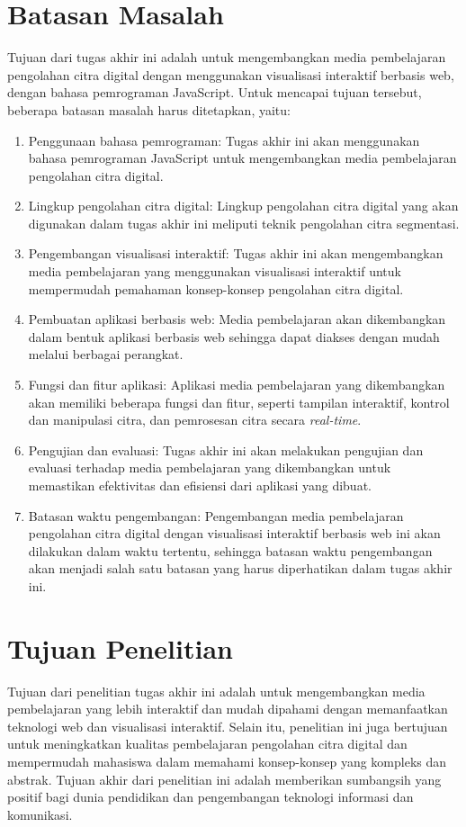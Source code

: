 \section{Batasan Masalah}
Tujuan dari tugas akhir ini adalah untuk mengembangkan media pembelajaran pengolahan citra digital dengan menggunakan visualisasi interaktif berbasis web, dengan bahasa pemrograman JavaScript. Untuk mencapai tujuan tersebut, beberapa batasan masalah harus ditetapkan, yaitu:

\begin{enumerate}
    \item Penggunaan bahasa pemrograman: Tugas akhir ini akan menggunakan bahasa pemrograman JavaScript untuk mengembangkan media pembelajaran pengolahan citra digital.
    \item Lingkup pengolahan citra digital: Lingkup pengolahan citra digital yang akan digunakan dalam tugas akhir ini meliputi teknik pengolahan citra segmentasi.
    \item Pengembangan visualisasi interaktif: Tugas akhir ini akan mengembangkan media pembelajaran yang menggunakan visualisasi interaktif untuk mempermudah pemahaman konsep-konsep pengolahan citra digital.
    \item Pembuatan aplikasi berbasis web: Media pembelajaran akan dikembangkan dalam bentuk aplikasi berbasis web sehingga dapat diakses dengan mudah melalui berbagai perangkat.
    \item Fungsi dan fitur aplikasi: Aplikasi media pembelajaran yang dikembangkan akan memiliki beberapa fungsi dan fitur, seperti tampilan interaktif, kontrol dan manipulasi citra, dan pemrosesan citra secara \textit{real-time}.
    \item Pengujian dan evaluasi: Tugas akhir ini akan melakukan pengujian dan evaluasi terhadap media pembelajaran yang dikembangkan untuk memastikan efektivitas dan efisiensi dari aplikasi yang dibuat.
    \item Batasan waktu pengembangan: Pengembangan media pembelajaran pengolahan citra digital dengan visualisasi interaktif berbasis web ini akan dilakukan dalam waktu tertentu, sehingga batasan waktu pengembangan akan menjadi salah satu batasan yang harus diperhatikan dalam tugas akhir ini.
\end{enumerate}

\section{Tujuan Penelitian}
Tujuan dari penelitian tugas akhir ini adalah untuk mengembangkan media pembelajaran yang lebih interaktif dan mudah dipahami dengan memanfaatkan teknologi web dan visualisasi interaktif. Selain itu, penelitian ini juga bertujuan untuk meningkatkan kualitas pembelajaran pengolahan citra digital dan mempermudah mahasiswa dalam memahami konsep-konsep yang kompleks dan abstrak. Tujuan akhir dari penelitian ini adalah memberikan sumbangsih yang positif bagi dunia pendidikan dan pengembangan teknologi informasi dan komunikasi.

